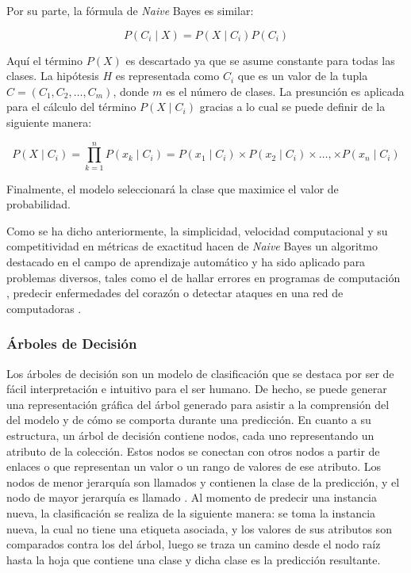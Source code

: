Por su parte, la fórmula de \textit{Naive} Bayes es similar:

\begin{equation}
   P(C_{i} \mid X) = P(X \mid C_{i}) P(C_{i})
\end{equation}

Aquí el término $P(X)$ es descartado ya que se asume constante para todas las
clases. La hipótesis $H$ es representada como $C_{i}$ que es un valor de la
tupla $C=(C_{1},C_{2},\dots,C_{m})$, donde $m$ es el número de clases. La
presunción  es aplicada para el cálculo del término $P(X \mid
C_{i})$ gracias a lo cual se puede definir de la siguiente manera:

\begin{equation} 
   P(X \mid C_{i}) = \prod\limits_{k=1}^n{P(x_{k} \mid C_{i})} =
   P(x_{1} \mid C_{i}) \times 
   P(x_{2} \mid C_{i}) \times \dots, \times 
   P(x_{n} \mid C_{i})   
\end{equation}

Finalmente, el modelo seleccionará la clase que maximice el valor de
probabilidad.  

Como se ha dicho anteriormente, la simplicidad, velocidad computacional y su
competitividad en métricas de exactitud hacen de \textit{Naive} Bayes un
algoritmo destacado en el campo de aprendizaje automático
\cite{wickramasinghe_naive_2020} y ha sido aplicado para problemas diversos,
tales como el de hallar errores en programas de computación
\cite{arar_feature_2017}, predecir enfermedades del corazón
\cite{dulhare_prediction_2018} o detectar ataques en una red de computadoras
\cite{kalutarage_detecting_2015}.


\subsubsection{Árboles de Decisión}

Los árboles de decisión son un modelo de clasificación que se destaca por ser de
fácil interpretación e intuitivo para el ser humano. De hecho, se puede generar
una representación gráfica del árbol generado para asistir a la comprensión del
del modelo y de cómo se comporta durante una predicción. En cuanto a su
estructura, un árbol de decisión contiene nodos, cada uno representando un
atributo de la colección. Estos nodos se conectan con otros nodos a partir de
enlaces o  que representan un valor o un rango de valores de ese
atributo. Los nodos de menor jerarquía son llamados  y contienen
la clase de la predicción, y el nodo de mayor jerarquía es llamado
. Al momento de predecir una instancia nueva, la clasificación se
realiza de la siguiente manera:  se toma la instancia nueva, la cual no tiene
una etiqueta asociada, y los valores de sus atributos son comparados contra los
del árbol, luego se traza un camino desde el nodo raíz hasta la hoja que
contiene una clase y dicha clase es la predicción resultante. 

